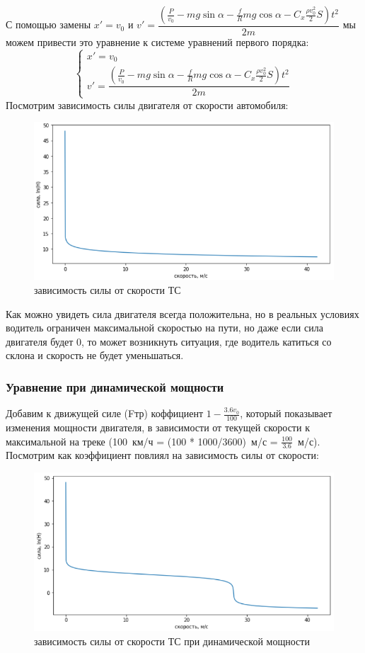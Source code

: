 \documentclass[A4paper,12pt]{article}
\theoremstyle{plain} %
\theoremstyle{definition} %
\theoremstyle{remark} %
\begin{document}
С помощью замены $x'=v_0$ и $v' = \dfrac{(\frac{P}{v_0}-mg\sin{\alpha} - \frac{f}{R}mg\cos{\alpha} - C_x\frac{\rho v_0^2}{2}S)t^2}{2m}$ мы можем привести это уравнение к системе уравнений первого порядка:
\[
\begin{cases}
x' = v_0\\
v'=\dfrac{(\frac{P}{v_0}-mg\sin{\alpha} - \frac{f}{R}mg\cos{\alpha} - C_x\frac{\rho v_0^2}{2}S)t^2}{2m}
\end{cases}
\]
Посмотрим зависимость силы двигателя от скорости автомобиля:
\begin{figure}[h!]
    \centering
    \includegraphics[scale = 0.6]{Скорость_сила.png}
    \caption{зависимость силы от скорости ТС}
\end{figure}

Как можно увидеть сила двигателя всегда положительна, но в реальных условиях водитель ограничен максимальной скоростью на пути, но даже если сила двигателя будет 0, то может возникнуть ситуация, где водитель катиться со склона и скорость не будет уменьшаться.
\subsubsection*{Уравнение при динамической мощности}
Добавим к движущей силе (Fтр) коффициент $1-\frac{3.6v_0}{100}$, который показывает изменения мощности двигателя, в зависимости от текущей скорости к максимальной на треке (100~км/ч = (100 * 1000/3600)~м/с = $\frac{100}{3.6}$~м/с). Посмотрим как коэффициент повлиял на зависимость силы от скорости:
\begin{figure}[h!]
    \centering
    \includegraphics[scale = 0.6]{Скорость_сила_коэф.png}
    \caption{зависимость силы от скорости ТС при динамической мощности}
\end{figure}
\end{document}
